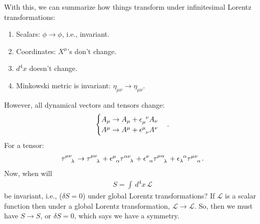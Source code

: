\documentclass{book}
\numberwithin{equation}{section}
\theoremstyle{definition}
\newcommand{\lag}{\mathcal{L}}
\begin{document}
With this, we can summarize how things transform under infinitesimal Lorentz transformations:
\begin{enumerate}
	\item Scalars: $\phi \to \phi$, i.e., invariant.
	\item Coordinates: $X^\mu$'s don't change. 
	\item $d^4x$ doesn't change.
	\item Minkowski metric is invariant: $\eta_{\mu\nu} \to \eta_{\mu\nu}$.
\end{enumerate}

However, all dynamical vectors and tensors change:
\begin{align}
\begin{cases}
A_\mu \to A_\mu + \tensor{\epsilon}{_\mu^\nu}A_\nu\\
A^\mu \to A^\mu + \tensor{\epsilon}{^\mu_\nu}A^\nu
\end{cases}.
\end{align}
For a tensor:
\begin{align}
\tensor{\tau}{^{\mu\nu}_\lambda} \to \tensor{\tau}{^{\mu\nu}_\lambda}
+\tensor{\epsilon}{^\mu_\alpha}\tensor{\tau}{^{\alpha\nu}_\lambda}
+\tensor{\epsilon}{^\nu_\alpha}\tensor{\tau}{^{\mu\alpha}_\lambda}
+\tensor{\epsilon}{_\lambda^\alpha}\tensor{\tau}{^{\mu\nu}_\alpha}.
\end{align}
Now, when will 
\begin{align}
S = \int \,d^4x \, \lag
\end{align}
be invariant, i.e., ($\delta S = 0$) under global Lorentz transformations? If $\lag$ is a scalar function then under a global Lorentz transformation, $\lag\to\lag$. So, then we must have $S \to S$, or $\delta S = 0$, which says we have a symmetry.
\end{document}
